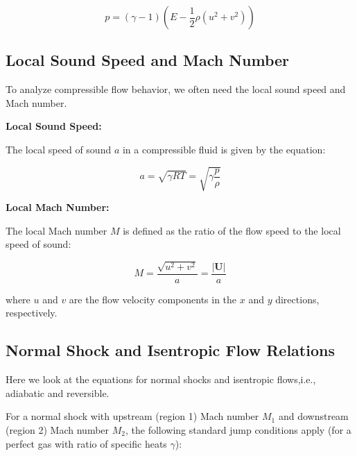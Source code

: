 \documentclass[11pt]{article}
\begin{document}
\begin{equation}
    p = (\gamma - 1)\left(E - \frac{1}{2} \rho (u^2 + v^2)\right)
\end{equation}
\vspace{2mm}


\subsection{Local Sound Speed and Mach Number}
To analyze compressible flow behavior, we often need the local sound speed and Mach number.
\vspace{2.5mm}

\textbf{Local Sound Speed:}

The local speed of sound \( a \) in a compressible fluid is given by the equation:

\begin{equation}
    a = \sqrt{\gamma R T} =\sqrt{\gamma \frac{p}{\rho}}
    \label{speedofsound}
\end{equation}

\textbf{Local Mach Number:}

The local Mach number \( M \) is defined as the ratio of the flow speed to the local speed of sound:

\begin{equation}
M = \frac{\sqrt{u^2 + v^2}}{a} = \frac{|\textbf{U}|}{a}
\label{Mach_equation}
\end{equation}

where \( u \) and \( v \) are the flow velocity components in the \( x \) and \( y \) directions, respectively.

\subsection{Normal Shock and Isentropic Flow Relations}
Here we look at the equations for normal shocks and isentropic flows,i.e., adiabatic and reversible.
\vspace{2.5mm}

For a normal shock with upstream (region 1) Mach number \(M_1\) and downstream (region 2) Mach number \(M_2\), the following standard jump conditions apply (for a perfect gas with ratio of specific heats \(\gamma\)):
\end{document}
